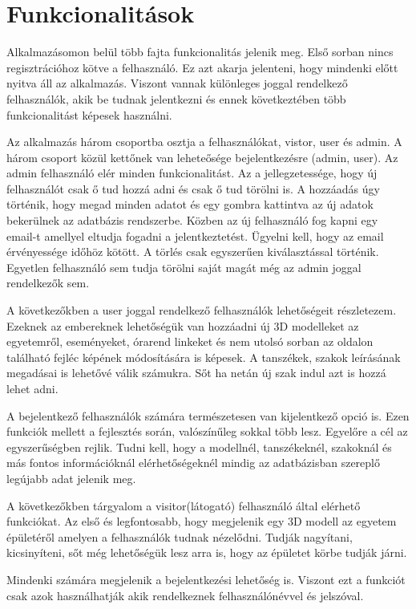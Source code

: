 \section{Funkcionalitások}

Alkalmazásomon belül több fajta funkcionalitás jelenik meg. Első sorban nincs regisztrációhoz kötve a felhasználó. Ez azt akarja jelenteni, hogy mindenki előtt nyitva áll az alkalmazás. Viszont vannak különleges joggal rendelkező felhasználók, akik be tudnak jelentkezni és ennek következtében több funkcionalitást képesek használni.

Az alkalmazás három csoportba osztja a felhasználókat, vistor, user és admin. A három csoport közül kettőnek van leheteősége bejelentkezésre (admin, user). Az admin felhasználó elér minden funkcionalitást. Az a jellegzetessége, hogy új felhasználót csak ő tud hozzá adni és csak ő tud törölni is. A hozzáadás úgy történik, hogy megad minden adatot és egy gombra kattintva az új adatok bekerülnek az adatbázis rendszerbe. Közben az új felhasználó fog kapni egy email-t amellyel eltudja fogadni a jelentkeztetést. Ügyelni kell, hogy az email érvényessége időhöz kötött. A törlés csak egyszerűen kiválasztással történik. Egyetlen felhasználó sem tudja törölni saját magát még az admin joggal rendelkezők sem.

A következőkben a user joggal rendelkező felhasználók lehetőségeit részletezem. Ezeknek az embereknek lehetőségük van hozzáadni új 3D modelleket az egyetemről, eseményeket, órarend linkeket és nem utolsó sorban az oldalon található fejléc képének módosítására is képesek. A tanszékek, szakok leírásának megadásai is lehetővé válik számukra. Sőt ha netán új szak indul azt is hozzá lehet adni.

A bejelentkező felhasználók számára természetesen van kijelentkező opció is. Ezen funkciók mellett a fejlesztés során, valószínűleg sokkal több lesz. Egyelőre a cél az egyszerűségben rejlik. Tudni kell, hogy a modellnél, tanszékeknél, szakoknál és más fontos információknál elérhetőségeknél mindig az adatbázisban szereplő legújabb adat jelenik meg. 

A következőkben tárgyalom a visitor(látogató) felhasználó által elérhető funkciókat. Az első és legfontosabb, hogy megjelenik egy 3D modell az egyetem épületéről amelyen a felhasználók tudnak nézelődni. Tudják nagyítani, kicsinyíteni, sőt még lehetőségük lesz arra is, hogy az épületet körbe tudják járni. 

Mindenki számára megjelenik a bejelentkezési lehetőség is. Viszont ezt a funkciót csak azok használhatják akik rendelkeznek felhasználónévvel és jelszóval.

